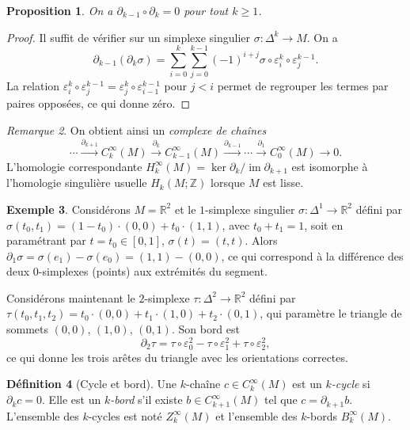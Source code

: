 \documentclass[12pt,a4paper,openany]{book}
\theoremstyle{definition}
\newtheorem{definition}{Définition}[chapter]
\newtheorem{exemple}[definition]{Exemple}
\theoremstyle{plain}
\newtheorem{proposition}[definition]{Proposition}
\theoremstyle{remark}
\newtheorem{remarque}[definition]{Remarque}
\newcommand{\Z}{\mathbb{Z}}
\newcommand{\R}{\mathbb{R}}
\DeclareMathOperator{\im}{im}
\begin{document}
\begin{proposition}\label{prop:d-carre-zero-chaines}
On a $\partial_{k-1} \circ \partial_k = 0$ pour tout $k \geq 1$.
\end{proposition}

\begin{proof}
Il suffit de vérifier sur un simplexe singulier $\sigma \colon \Delta^k \to M$.
On a
\[
  \partial_{k-1}(\partial_k \sigma)
  = \sum_{i=0}^{k} \sum_{j=0}^{k-1} (-1)^{i+j}
    \sigma \circ \varepsilon_i^k \circ \varepsilon_j^{k-1}.
\]
La relation $\varepsilon_i^k \circ \varepsilon_j^{k-1}
= \varepsilon_j^k \circ \varepsilon_{i-1}^{k-1}$ pour $j < i$ permet de
regrouper les termes par paires opposées, ce qui donne zéro.
\end{proof}

\begin{remarque}\label{rem:complexe-chaines}
On obtient ainsi un \emph{complexe de chaînes}
\[
  \cdots \xrightarrow{\partial_{k+1}} C_k^\infty(M)
  \xrightarrow{\partial_k} C_{k-1}^\infty(M)
  \xrightarrow{\partial_{k-1}} \cdots
  \xrightarrow{\partial_1} C_0^\infty(M) \to 0.
\]
L'homologie correspondante $H_k^\infty(M) = \ker \partial_k / \im \partial_{k+1}$
est isomorphe à l'homologie singulière usuelle $H_k(M;\Z)$ lorsque $M$ est lisse.
\end{remarque}

\begin{exemple}\label{ex:chaine-1}
Considérons $M = \R^2$ et le $1$-simplexe singulier $\sigma \colon \Delta^1 \to \R^2$
défini par $\sigma(t_0, t_1) = (1 - t_0) \cdot (0,0) + t_0 \cdot (1,1)$, avec
$t_0 + t_1 = 1$, soit en paramétrant par $t = t_0 \in [0,1]$, $\sigma(t) = (t,t)$.
Alors $\partial_1 \sigma = \sigma(e_1) - \sigma(e_0) = (1,1) - (0,0)$, ce qui
correspond à la différence des deux $0$-simplexes (points) aux extrémités du
segment.

Considérons maintenant le $2$-simplexe $\tau \colon \Delta^2 \to \R^2$ défini par
$\tau(t_0, t_1, t_2) = t_0 \cdot (0,0) + t_1 \cdot (1,0) + t_2 \cdot (0,1)$, qui
paramètre le triangle de sommets $(0,0)$, $(1,0)$, $(0,1)$. Son bord est
\[
  \partial_2 \tau = \tau \circ \varepsilon_0^2 - \tau \circ \varepsilon_1^2
  + \tau \circ \varepsilon_2^2,
\]
ce qui donne les trois arêtes du triangle avec les orientations correctes.
\end{exemple}

\begin{definition}[Cycle et bord]\label{def:cycle-bord}
Une $k$-chaîne $c \in C_k^\infty(M)$ est un \emph{$k$-cycle} si $\partial_k c = 0$.
Elle est un \emph{$k$-bord} s'il existe $b \in C_{k+1}^\infty(M)$ tel que
$c = \partial_{k+1} b$. L'ensemble des $k$-cycles est noté $Z_k^\infty(M)$ et
l'ensemble des $k$-bords $B_k^\infty(M)$.
\end{definition}
\end{document}
